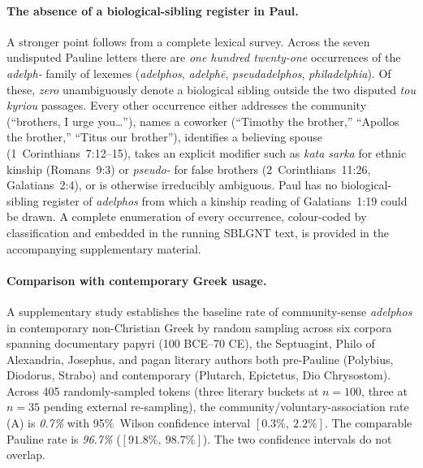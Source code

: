 \documentclass[12pt,oneside]{article}
\newcommand{\grk}[1]{\textit{#1}}   %
\begin{document}
\paragraph{The absence of a biological-sibling register in Paul.}
A stronger point follows from a complete lexical survey.  Across the
seven undisputed Pauline letters there are \textit{one hundred
twenty-one} occurrences of the \grk{adelph-} family of lexemes
(\grk{adelphos}, \grk{adelph\=e}, \grk{pseudadelphos},
\grk{philadelphia}).  Of these, \textit{zero} unambiguously denote a
biological sibling outside the two disputed \grk{tou kyriou} passages.
Every other occurrence either addresses the community (``brothers, I
urge you\ldots''), names a coworker (``Timothy the brother,'' ``Apollos
the brother,'' ``Titus our brother''), identifies a believing spouse
(1~Corinthians~7:12--15), takes an explicit modifier such as
\grk{kata sarka} for ethnic kinship (Romans~9:3) or \grk{pseudo-} for
false brothers (2~Corinthians~11:26, Galatians~2:4), or is otherwise
irreducibly ambiguous.  Paul has no biological-sibling register of
\grk{adelphos} from which a kinship reading of Galatians~1:19 could be
drawn.  A complete enumeration of every occurrence, colour-coded by
classification and embedded in the running SBLGNT text, is provided in
the accompanying supplementary material.

\paragraph{Comparison with contemporary Greek usage.}
A supplementary study establishes the baseline rate of community-sense
\grk{adelphos} in contemporary non-Christian Greek by random sampling
across six corpora spanning documentary papyri (100 BCE--70 CE), the
Septuagint, Philo of Alexandria, Josephus, and pagan literary authors
both pre-Pauline (Polybius, Diodorus, Strabo) and contemporary
(Plutarch, Epictetus, Dio Chrysostom).  Across 405 randomly-sampled
tokens (three literary buckets at $n=100$, three at $n=35$ pending
external re-sampling), the community/voluntary-association rate (A)
is \textit{0.7\%} with 95\%~Wilson confidence interval $[0.3\%,~2.2\%]$.
The comparable Pauline rate is \textit{96.7\%} ($[91.8\%,~98.7\%]$).
The two confidence intervals do not overlap.
\end{document}
